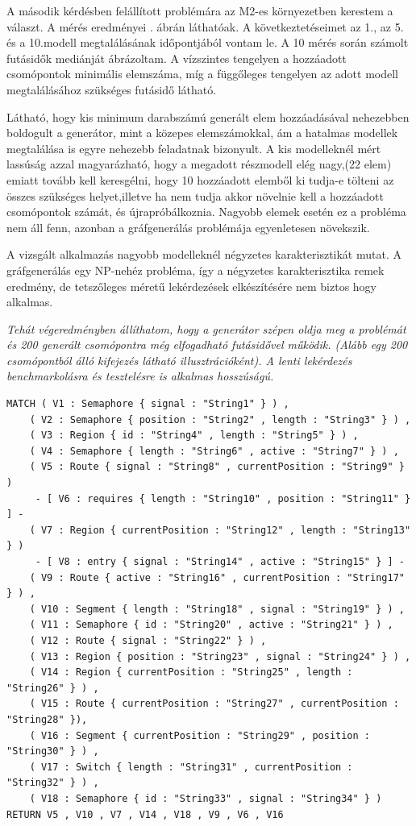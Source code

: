 A második kérdésben felállított problémára az M2-es környezetben kerestem a választ. A mérés eredményei . ábrán láthatóak. A következtetéseimet az 1., az 5. és a 10.modell megtalálásának  időpontjából vontam le. A 10 mérés során számolt futásidők mediánját ábrázoltam. A vízszintes tengelyen a hozzáadott csomópontok minimális elemszáma, míg a függőleges tengelyen az adott modell megtalálásához szükséges futásidő látható. 

Látható, hogy kis minimum darabszámú generált elem hozzáadásával nehezebben boldogult a generátor, mint a közepes elemszámokkal, ám a hatalmas modellek megtalálása is egyre nehezebb feladatnak bizonyult. A kis modelleknél mért lassúság azzal magyarázható, hogy a megadott részmodell elég nagy,(22 elem) emiatt tovább kell keresgélni, hogy 10 hozzáadott elemből ki tudja-e tölteni az összes szükséges helyet,illetve ha nem tudja akkor növelnie kell a hozzáadott csomópontok számát, és újrapróbálkoznia. Nagyobb elemek esetén ez a probléma nem áll fenn, azonban a gráfgenerálás problémája egyenletesen növekszik.

A vizsgált alkalmazás nagyobb modelleknél négyzetes karakterisztikát mutat. A gráfgenerálás egy NP-nehéz probléma, így a négyzetes karakterisztika remek eredmény, de tetszőleges méretű lekérdezések elkészítésére nem biztos hogy alkalmas.

\textit{Tehát végeredményben állíthatom, hogy a generátor szépen oldja meg a problémát és 200 generált csomópontra még elfogadható futásidővel működik. (Alább egy 200 csomópontból álló kifejezés látható illusztrációként). A lenti lekérdezés benchmarkolásra és tesztelésre is alkalmas hosszúságú.}

\begin{lstlisting}[style=cyphersmall]
MATCH ( V1 : Semaphore { signal : "String1" } ) ,
	( V2 : Semaphore { position : "String2" , length : "String3" } ) ,
	( V3 : Region { id : "String4" , length : "String5" } ) ,
	( V4 : Semaphore { length : "String6" , active : "String7" } ) ,
	( V5 : Route { signal : "String8" , currentPosition : "String9" } )
	 - [ V6 : requires { length : "String10" , position : "String11" } ] - 
	( V7 : Region { currentPosition : "String12" , length : "String13" } )
	 - [ V8 : entry { signal : "String14" , active : "String15" } ] -
	( V9 : Route { active : "String16" , currentPosition : "String17" } ) ,
	( V10 : Segment { length : "String18" , signal : "String19" } ) ,
	( V11 : Semaphore { id : "String20" , active : "String21" } ) ,
	( V12 : Route { signal : "String22" } ) ,
	( V13 : Region { position : "String23" , signal : "String24" } ) ,
	( V14 : Region { currentPosition : "String25" , length : "String26" } ) ,
	( V15 : Route { currentPosition : "String27" , currentPosition : "String28" }),
	( V16 : Segment { currentPosition : "String29" , position : "String30" } ) ,
	( V17 : Switch { length : "String31" , currentPosition : "String32" } ) ,
	( V18 : Semaphore { id : "String33" , signal : "String34" } )
RETURN V5 , V10 , V7 , V14 , V18 , V9 , V6 , V16
\end{lstlisting}




